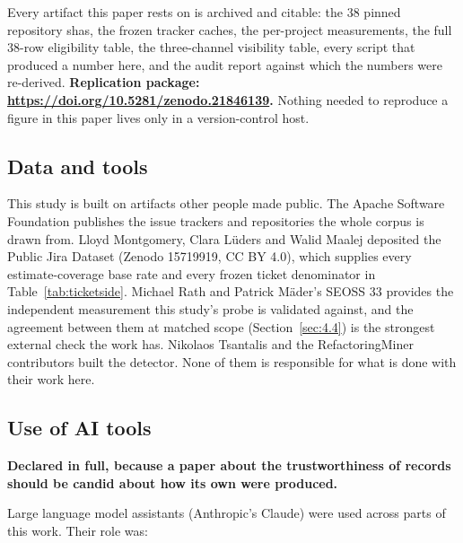 \documentclass[11pt,a4paper]{article}
\begin{document}
Every artifact this paper rests on is archived and citable: the 38 pinned repository shas, the frozen tracker caches, the per-project measurements, the full 38-row eligibility table, the three-channel visibility table, every script that produced a number here, and the audit report against which the numbers were re-derived. \textbf{Replication package: \href{https://doi.org/10.5281/zenodo.21846139}{https://doi.org/10.5281/zenodo.21846139}.} Nothing needed to reproduce a figure in this paper lives only in a version-control host.

\subsection{Data and tools}
\label{sec:8.2}

This study is built on artifacts other people made public. The Apache Software Foundation publishes the issue trackers and repositories the whole corpus is drawn from. Lloyd Montgomery, Clara L\"uders and Walid Maalej deposited the Public Jira Dataset (Zenodo 15719919, CC BY 4.0), which supplies every estimate-coverage base rate and every frozen ticket denominator in Table~\ref{tab:ticketside}. Michael Rath and Patrick M\"ader's SEOSS 33 provides the independent measurement this study's probe is validated against, and the agreement between them at matched scope (Section~\ref{sec:4.4}) is the strongest external check the work has. Nikolaos Tsantalis and the RefactoringMiner contributors built the detector. None of them is responsible for what is done with their work here.

\subsection{Use of AI tools}
\label{sec:8.3}

\textbf{Declared in full, because a paper about the trustworthiness of records should be candid about how its own were produced.}

Large language model assistants (Anthropic's Claude) were used across parts of this work. Their role was:
\end{document}

